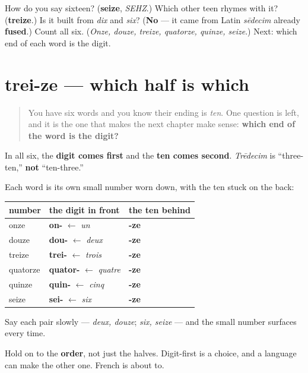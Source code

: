 \begin{tcolorbox}[breakable,colback=teal!4,colframe=teal!35!black,title={Before you move on}]
How do you say sixteen? (\textbf{seize}, \emph{SEHZ}.) Which other teen rhymes with it? (\textbf{treize}.) Is it built from \emph{dix} and \emph{six}? (\textbf{No} — it came from Latin \emph{sēdecim} already \textbf{fused}.) Count all six. (\emph{Onze, douze, treize, quatorze, quinze, seize}.) Next: which end of each word is the digit.
\end{tcolorbox}
\section[trei-ze]{trei-\textbf{ze} — which half is which}

\label{lesson:FR-C12-digit-first}



\begin{quote}
You have six words and you know their ending is \emph{ten}. One question is left, and it is the one that makes the next chapter make sense: \textbf{which end of the word is the digit?}
\end{quote}

\begin{grammarlens}[title={Grammar Lens: digit in front, ten behind}]
In all six, the \textbf{digit comes first} and the \textbf{ten comes second}. \emph{Trēdecim} is \textquotedblleft{}three-ten,\textquotedblright{} \textbf{not} \textquotedblleft{}ten-three.\textquotedblright{}

Each word is its own small number worn down, with the ten stuck on the back:

\noindent
\begin{tabularx}{\linewidth}{@{}>{\raggedright\arraybackslash}X>{\raggedright\arraybackslash}X>{\raggedright\arraybackslash}X@{}}
\toprule
\textbf{number} & \textbf{the digit in front} & \textbf{the ten behind} \\
\midrule
onze & \textbf{on-} $\leftarrow$ \emph{un} & \textbf{-ze} \\
douze & \textbf{dou-} $\leftarrow$ \emph{deux} & \textbf{-ze} \\
treize & \textbf{trei-} $\leftarrow$ \emph{trois} & \textbf{-ze} \\
quatorze & \textbf{quator-} $\leftarrow$ \emph{quatre} & \textbf{-ze} \\
quinze & \textbf{quin-} $\leftarrow$ \emph{cinq} & \textbf{-ze} \\
seize & \textbf{sei-} $\leftarrow$ \emph{six} & \textbf{-ze} \\
\bottomrule
\end{tabularx}

Say each pair slowly — \emph{deux, douze}; \emph{six, seize} — and the small number surfaces every time.

Hold on to the \textbf{order}, not just the halves. Digit-first is a choice, and a language can make the other one. French is about to.
\end{grammarlens}

